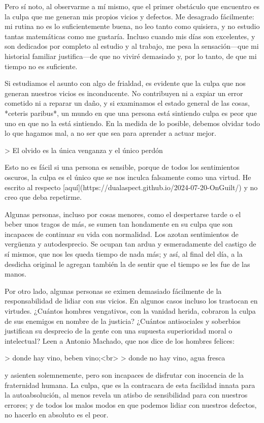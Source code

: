 \documentclass[a4paper, 12pt]{article}
\begin{document}
Pero sí noto, al observarme a mí mismo, que el primer obstáculo que encuentro es
la culpa que me generan mis propios vicios y defectos. Me desagrado fácilmente:
mi rutina no es lo suficientemente buena, no leo tanto como quisiera, y no
estudio tantas matemáticas como me gustaría. Incluso cuando mis días son
excelentes, y son dedicados por completo al estudio y al trabajo, me pesa la
sensación—que mi historial familiar justifica—de que no viviré demasiado y, por
lo tanto, de que mi tiempo no es suficiente. 

Si estudiamos el asunto con algo de frialdad, es evidente que la culpa que
nos generan nuestros vicios es inconducente. No contribuyen ni a expiar un
error cometido ni a reparar un daño, y si examinamos el estado general de las
cosas, *ceteris paribus*, un mundo en que una persona está sintiendo
culpa es peor que uno en que no la está sintiendo. En la medida de lo posible,
debemos olvidar todo lo que hagamos mal, a no ser que sea para aprender a
actuar mejor.

> El olvido es la única venganza y el único perdón

Esto no es fácil si una persona es sensible, porque de todos los sentimientos
oscuros, la culpa es el único que se nos inculca falsamente como una virtud.
He escrito al respecto
[aquí](https://dualaspect.github.io/2024-07-20-OnGuilt/) y no creo que deba
repetirme.

Algunas personas, incluso por cosas menores, como el despertarse tarde o el
beber unos tragos de más, se sumen tan hondamente en su culpa que son incapaces
de continuar su vida con normalidad. Los azotan sentimientos de vergüenza y
autodesprecio. Se ocupan tan ardua y esmeradamente del castigo de sí mismos, que
nos les queda tiempo de nada más; y así, al final del día, a la desdicha
original le agregan también la de sentir que el tiempo se les fue de las manos.

Por otro lado, algunas personas se eximen demasiado fácilmente de la
responsabilidad de lidiar con sus vicios. En algunos casos incluso los
trastocan en virtudes. ¿Cuántos hombres vengativos, con la vanidad herida,
cobraron la culpa de sus enemigos en nombre de la justicia? ¿Cuántos
antisociales y soberbios justifican su desprecio de la gente con una supuesta
superioridad moral o intelectual? Leen a Antonio Machado, que nos dice de los
hombres felices:

> donde hay vino, beben vino;<br>
> donde no hay vino, agua fresca

y asienten solemnemente, pero son incapaces de disfrutar con inocencia de la
fraternidad humana. La culpa, que es la contracara de esta facilidad innata para
la autoabsolución, al menos revela un atisbo de sensibilidad para con nuestros
errores; y de todos los malos modos en que podemos lidiar con nuestros defectos,
no hacerlo en absoluto es el peor. 
\end{document}
